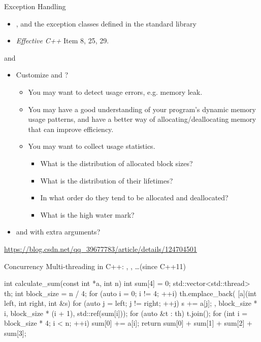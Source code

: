 \begin{frame}{Exception Handling}
    \begin{itemize}
        \item {},  and the exception classes defined in the standard library
        \item \textit{Effective C++} Item 8, 25, 29.
    \end{itemize}
\end{frame}

\begin{frame}{ and }
    \begin{itemize}
        \item Customize  and ?
        \begin{itemize}
            \item You may want to detect usage errors, e.g. memory leak.
            \item You may have a good understanding of your program's dynamic memory usage patterns, and have a better way of allocating/deallocating memory that can improve efficiency.
            \item You may want to collect usage statistics.
            \begin{itemize}
                \item What is the distribution of allocated block sizes?
                \item What is the distribution of their lifetimes?
                \item In what order do they tend to be allocated and deallocated?
                \item What is the high water mark?
            \end{itemize}
        \end{itemize}
        \item {} and  with extra arguments?
    \end{itemize}
    \footnotesize\url{https://blog.csdn.net/qq_39677783/article/details/124704501}
\end{frame}

\begin{frame}[fragile]{Concurrency}
    Multi-threading in C++: , , \dots (since C++11)
    \begin{cpp}
int calculate_sum(const int *a, int n) {
  int sum[4] = {0};
  std::vector<std::thread> th;
  int block_size = n / 4;
  for (auto i = 0; i != 4; ++i)
    th.emplace_back(
        [a](int left, int right, int &s) {
          for (auto j = left; j != right; ++j)
            s += a[j];
        }, block_size * i, block_size * (i + 1),
            std::ref(sum[i]));
  for (auto &t : th) t.join();
  for (int i = block_size * 4; i < n; ++i)
    sum[0] += a[i];
  return sum[0] + sum[1] + sum[2] + sum[3];
}
    \end{cpp}
\end{frame}

